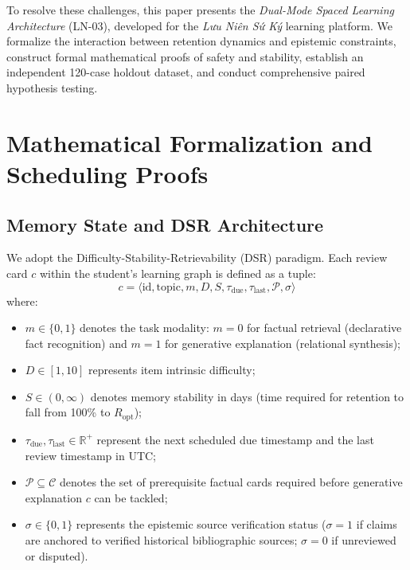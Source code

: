 \documentclass[11pt,a4paper]{article}
\begin{document}
To resolve these challenges, this paper presents the \textit{Dual-Mode Spaced Learning Architecture} (LN-03), developed for the \textit{Lưu Niên Sứ Ký} learning platform. We formalize the interaction between retention dynamics and epistemic constraints, construct formal mathematical proofs of safety and stability, establish an independent 120-case holdout dataset, and conduct comprehensive paired hypothesis testing.

\section{Mathematical Formalization and Scheduling Proofs}
\label{sec:formalization}

\subsection{Memory State and DSR Architecture}
We adopt the Difficulty-Stability-Retrievability (DSR) paradigm. Each review card $c$ within the student's learning graph is defined as a tuple:
\begin{equation}
    c = \langle \text{id}, \text{topic}, m, D, S, \tau_{\text{due}}, \tau_{\text{last}}, \mathcal{P}, \sigma \rangle
\end{equation}
where:
\begin{itemize}[leftmargin=*]
    \item $m \in \{0, 1\}$ denotes the task modality: $m=0$ for factual retrieval (declarative fact recognition) and $m=1$ for generative explanation (relational synthesis);
    \item $D \in [1, 10]$ represents item intrinsic difficulty;
    \item $S \in (0, \infty)$ denotes memory stability in days (time required for retention to fall from 100\% to $R_{\text{opt}}$);
    \item $\tau_{\text{due}}, \tau_{\text{last}} \in \mathbb{R}^+$ represent the next scheduled due timestamp and the last review timestamp in UTC;
    \item $\mathcal{P} \subseteq \mathcal{C}$ denotes the set of prerequisite factual cards required before generative explanation $c$ can be tackled;
    \item $\sigma \in \{0, 1\}$ represents the epistemic source verification status ($\sigma=1$ if claims are anchored to verified historical bibliographic sources; $\sigma=0$ if unreviewed or disputed).
\end{itemize}
\end{document}
